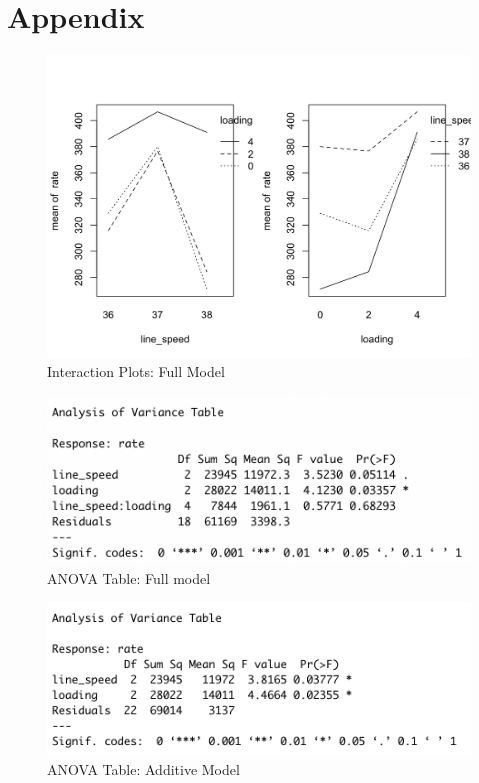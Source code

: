 \documentclass[11pt,a4paper]{article}
\begin{document}
\section{Appendix}
\begin{figure}[htb]
    \centering
    \includegraphics[scale=0.3]{inter1.png}
    \caption{Interaction Plots: Full Model}
    \label{}
\end{figure}
\begin{figure}[htb]
    \centering
    \includegraphics[scale=0.8]{inter2.png}
    \caption{ANOVA Table: Full model}
    \label{}
\end{figure}

\begin{figure}[htb]
    \centering
    \includegraphics[scale=0.8]{add1.png}
    \caption{ANOVA Table: Additive Model}
    \label{}
\end{figure}
\end{document}
